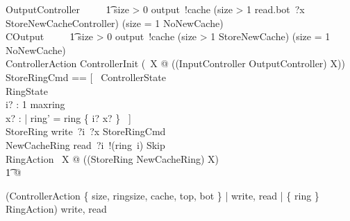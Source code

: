 \begin{circus}
    OutputController ~~\circdef~~
            \t1 \lcircguard size > 0 \rcircguard \circguard output~!cache \then
            (\lcircguard size > 1 \rcircguard \circguard read.bot~?x \then StoreNewCacheController)
            \extchoice
            (\lcircguard size = 1 \rcircguard \circguard NoNewCache) \\
    COutput ~~\circdef~~
            \t1 \lcircguard size > 0 \rcircguard \circguard output~!cache \then
            (\lcircguard size > 1 \rcircguard \circguard StoreNewCache)
            \extchoice
            (\lcircguard size = 1 \rcircguard \circguard NoNewCache) \\


    ControllerAction \circdef ControllerInit \circseq (\circmu\ X @ ((InputController \extchoice OutputController) \circseq X)) \\

    StoreRingCmd == [~
            \Xi ControllerState
            \\%
            \Delta RingState
            \\%
            i? : 1 \upto maxring
            \\%
            x? : \nat
        |
            ring' = ring \oplus \{ i? \mapsto x? \} ~] \\

   StoreRing \circdef write~?i~?x \then StoreRingCmd \\
   NewCacheRing \circdef read~?i~!(ring~i) \then Skip \\

   RingAction \circdef \circmu\ X @ ((StoreRing \extchoice NewCacheRing) \circseq X) \\
    \t1 @

   (ControllerAction \lpar
        \{ size, ringsize, cache, top, bot \} |
        \lchanset write, read \rchanset |
        \{ ring \} \rpar
    RingAction) \circhide \lchanset write, read \rchanset \\
    \circend
\end{circus}
